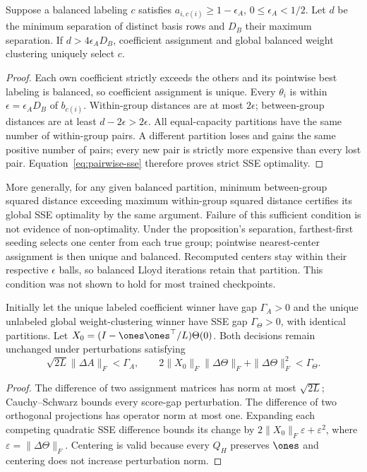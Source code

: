 \begin{proposition}
\label{prop:near-hard-agreement}
Suppose a balanced labeling $c$ satisfies $a_{i,c(i)}\ge1-\epsilon_A$,
$0\le\epsilon_A<1/2$. Let $d$ be the minimum separation of distinct
basis rows and $D_B$ their maximum separation. If
$d>4\epsilon_A D_B$, coefficient assignment and global balanced weight
clustering uniquely select $c$.
\end{proposition}
\begin{proof}
Each own coefficient strictly exceeds the others and its pointwise best
labeling is balanced, so coefficient assignment is unique. Every
$\theta_i$ is within $\epsilon=\epsilon_A D_B$ of $b_{c(i)}$.
Within-group distances are at most $2\epsilon$; between-group distances
are at least $d-2\epsilon>2\epsilon$. All equal-capacity partitions
have the same number of within-group pairs. A different partition loses
and gains the same positive number of pairs; every new pair is strictly
more expensive than every lost pair. Equation~\eqref{eq:pairwise-sse}
therefore proves strict SSE optimality.
\end{proof}

More generally, for any given balanced partition, minimum between-group
squared distance exceeding maximum within-group squared distance certifies
its global SSE optimality by the same argument. Failure of this sufficient
condition is not evidence of non-optimality. Under the proposition's
separation, farthest-first seeding selects one center from each true group;
pointwise nearest-center assignment is then unique and balanced. Recomputed
centers stay within their respective $\epsilon$ balls, so balanced Lloyd
iterations retain that partition. This condition was not shown to hold
for most trained checkpoints.

\begin{proposition}
\label{prop:decision-margin}
Initially let the unique labeled coefficient winner have gap $\Gamma_A>0$
and the unique unlabeled global weight-clustering winner have SSE gap
$\Gamma_\Theta>0$, with identical partitions. Let
$X_0=(I-\ones\ones^\top/L)\Theta(0)$. Both decisions remain unchanged
under perturbations satisfying
\begin{equation}
 \sqrt{2L}\|\Delta A\|_F<\Gamma_A,\qquad
 2\|X_0\|_F\|\Delta\Theta\|_F+\|\Delta\Theta\|_F^2<\Gamma_\Theta.
 \label{eq:decision-margin}
\end{equation}
\end{proposition}
\begin{proof}
The difference of two assignment matrices has norm at most $\sqrt{2L}$;
Cauchy--Schwarz bounds every score-gap perturbation. The difference of
two orthogonal projections has operator norm at most one. Expanding each
competing quadratic SSE difference bounds its change by
$2\|X_0\|_F\varepsilon+\varepsilon^2$, where
$\varepsilon=\|\Delta\Theta\|_F$. Centering is valid because every
$Q_H$ preserves $\ones$ and centering does not increase perturbation norm.
\end{proof}

